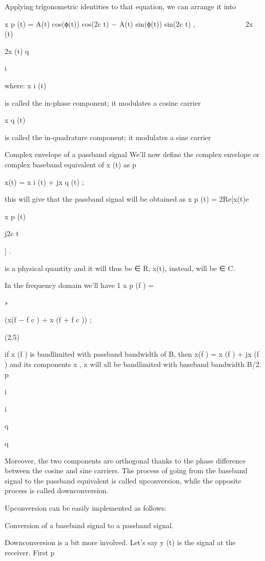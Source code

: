 {Applying trigonometric identities to that equation, we can arrange it into

x p (t) = A(t) cos(ϕ(t)) cos(2\pif c t) − A(t) sin(ϕ(t)) sin(2\pif c t) ,










\sqrt 2x (t)

\sqrt 2x (t)
q

i

where:
x i (t)

is called the in-phase component; it modulates a cosine carrier

x q (t)

is called the in-quadrature component; it modulates a sine carrier

Complex envelope of a passband signal We'll now define the complex envelope or complex baseband equivalent of x (t) as p

x(t) = x i (t) + jx q (t) ;

this will give that the passband signal will be obtained as x p (t) = \sqrt 2Re[x(t)e

x p (t)

j2\pif c t

] .

is a physical quantity and it will thus be ∈ R; x(t), instead, will be ∈ C.

In the frequency domain we'll have 1 x p (f ) =

∗

(x(f − f c ) + x (f + f c )) ;

(2.5)


if x (f ) is bandlimited with passband bandwidth of B, then x(f ) = x (f ) + jx (f ) and its components x , x will all be bandlimited with baseband bandwidth B/2.
p

i

i

q

q

Moreover, the two components are orthogonal thanks to the phase difference between the cosine and sine carriers.
The process of going from the baseband signal to the passband equivalent is called upconversion, while the opposite process is called downconversion.

Upconversion can be easily implemented as follows:

Conversion of a baseband signal to a passband signal.

Downconversion is a bit more involved. Let's say y (t) is the signal at the receiver. First p

}
